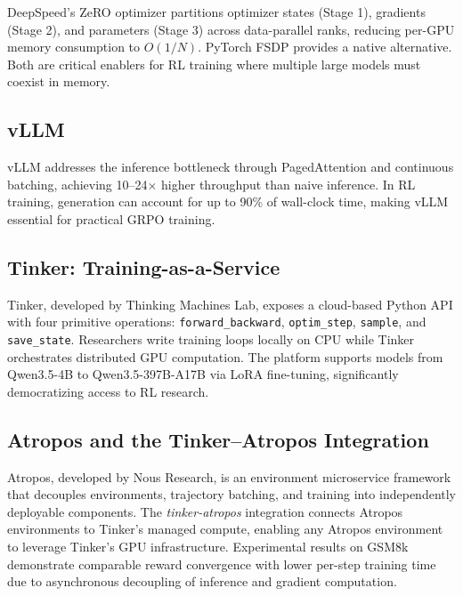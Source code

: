 \documentclass[12pt,a4paper]{report}
\begin{document}
DeepSpeed's ZeRO optimizer \cite{rajbhandari2020zero} partitions optimizer states (Stage 1), gradients (Stage 2), and parameters (Stage 3) across data-parallel ranks, reducing per-GPU memory consumption to $O(1/N)$. PyTorch FSDP provides a native alternative. Both are critical enablers for RL training where multiple large models must coexist in memory.

\subsection{vLLM}

vLLM \cite{kwon2023vllm} addresses the inference bottleneck through PagedAttention and continuous batching, achieving 10--24$\times$ higher throughput than naive inference. In RL training, generation can account for up to 90\% of wall-clock time, making vLLM essential for practical GRPO training.

\subsection{Tinker: Training-as-a-Service}

Tinker, developed by Thinking Machines Lab, exposes a cloud-based Python API with four primitive operations: \texttt{forward\_backward}, \texttt{optim\_step}, \texttt{sample}, and \texttt{save\_state}. Researchers write training loops locally on CPU while Tinker orchestrates distributed GPU computation. The platform supports models from Qwen3.5-4B to Qwen3.5-397B-A17B via LoRA fine-tuning, significantly democratizing access to RL research.

\subsection{Atropos and the Tinker--Atropos Integration}

Atropos, developed by Nous Research, is an environment microservice framework that decouples environments, trajectory batching, and training into independently deployable components. The \emph{tinker-atropos} integration connects Atropos environments to Tinker's managed compute, enabling any Atropos environment to leverage Tinker's GPU infrastructure. Experimental results on GSM8k demonstrate comparable reward convergence with lower per-step training time due to asynchronous decoupling of inference and gradient computation.


\end{document}

